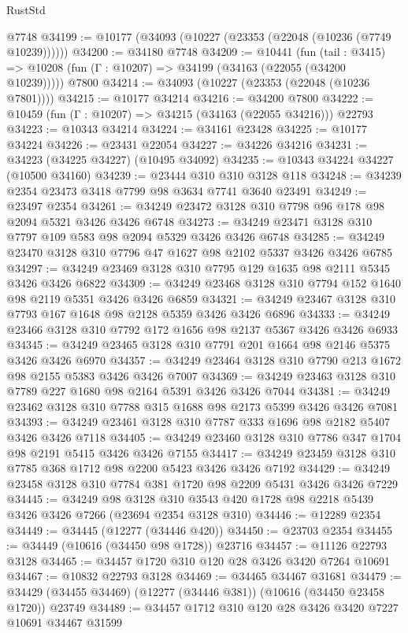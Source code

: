 \begin{lexlean}{RustStd}
\begin{coremodule}
    @7748
@34199 := @10177 (@34093 (@10227 (@23353 (@22048 (@10236 (@7749 @10239))))))
@34200 := @34180 @7748
@34209 := @10441
    (fun (tail : @3415) => @10208 (fun (Γ : @10207) => @34199 (@34163 (@22055 (@34200 @10239)))))
    @7800
@34214 := @34093 (@10227 (@23353 (@22048 (@10236 @7801))))
@34215 := @10177 @34214
@34216 := @34200 @7800
@34222 := @10459 (fun (Γ : @10207) => @34215 (@34163 (@22055 @34216))) @22793
@34223 := @10343 @34214
@34224 := @34161 @23428
@34225 := @10177 @34224
@34226 := @23431 @22054
@34227 := @34226 @34216
@34231 := @34223 (@34225 @34227) (@10495 @34092)
@34235 := @10343 @34224 @34227 (@10500 @34160)
@34239 := @23444 @310 @310 @3128 @118
@34248 := @34239 @2354 @23473 @3418 @7799 @98 @3634 @7741 @3640 @23491
@34249 := @23497 @2354
@34261 := @34249 @23472 @3128 @310 @7798 @96 @178 @98 @2094 @5321 @3426 @3426 @6748
@34273 := @34249 @23471 @3128 @310 @7797 @109 @583 @98 @2094 @5329 @3426 @3426 @6748
@34285 := @34249 @23470 @3128 @310 @7796 @47 @1627 @98 @2102 @5337 @3426 @3426 @6785
@34297 := @34249 @23469 @3128 @310 @7795 @129 @1635 @98 @2111 @5345 @3426 @3426 @6822
@34309 := @34249 @23468 @3128 @310 @7794 @152 @1640 @98 @2119 @5351 @3426 @3426 @6859
@34321 := @34249 @23467 @3128 @310 @7793 @167 @1648 @98 @2128 @5359 @3426 @3426 @6896
@34333 := @34249 @23466 @3128 @310 @7792 @172 @1656 @98 @2137 @5367 @3426 @3426 @6933
@34345 := @34249 @23465 @3128 @310 @7791 @201 @1664 @98 @2146 @5375 @3426 @3426 @6970
@34357 := @34249 @23464 @3128 @310 @7790 @213 @1672 @98 @2155 @5383 @3426 @3426 @7007
@34369 := @34249 @23463 @3128 @310 @7789 @227 @1680 @98 @2164 @5391 @3426 @3426 @7044
@34381 := @34249 @23462 @3128 @310 @7788 @315 @1688 @98 @2173 @5399 @3426 @3426 @7081
@34393 := @34249 @23461 @3128 @310 @7787 @333 @1696 @98 @2182 @5407 @3426 @3426 @7118
@34405 := @34249 @23460 @3128 @310 @7786 @347 @1704 @98 @2191 @5415 @3426 @3426 @7155
@34417 := @34249 @23459 @3128 @310 @7785 @368 @1712 @98 @2200 @5423 @3426 @3426 @7192
@34429 := @34249 @23458 @3128 @310 @7784 @381 @1720 @98 @2209 @5431 @3426 @3426 @7229
@34445 := @34249
    @98
    @3128
    @310
    @3543
    @420
    @1728
    @98
    @2218
    @5439
    @3426
    @3426
    @7266
    (@23694 @2354 @3128 @310)
@34446 := @12289 @2354
@34449 := @34445 (@12277 (@34446 @420))
@34450 := @23703 @2354
@34455 := @34449 (@10616 (@34450 @98 @1728)) @23716
@34457 := @11126 @22793 @3128
@34465 := @34457 @1720 @310 @120 @28 @3426 @3420 @7264 @10691
@34467 := @10832 @22793 @3128
@34469 := @34465 @34467 @31681
@34479 := @34429 (@34455 @34469) (@12277 (@34446 @381)) (@10616 (@34450 @23458 @1720)) @23749
@34489 := @34457 @1712 @310 @120 @28 @3426 @3420 @7227 @10691 @34467 @31599

\end{coremodule}
\end{lexlean}
